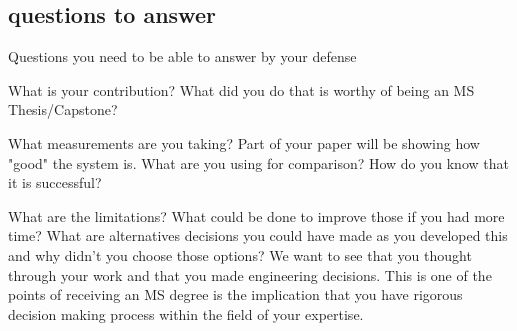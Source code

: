 \documentclass [11pt, proquest] {uwthesis}[2020/02/24]
\begin{document}
\subsection{questions to answer}
Questions you need to be able to answer by your defense

    What is your contribution? What did you do that is worthy of being an MS Thesis/Capstone?

    What measurements are you taking? Part of your paper will be showing how "good" the system is. What are you using for comparison? How do you know that it is successful?

    What are the limitations? What could be done to improve those if you had more time? 
    What are alternatives decisions you could have made as you developed this and why didn't you choose those options? 
    We want to see that you thought through your work and that you made engineering decisions. 
        This is one of the points of receiving an MS degree is the implication that you have rigorous decision making process within the field of your expertise.
        





\end{document}
